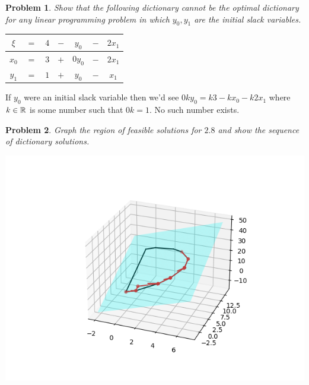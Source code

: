 \documentclass[12pt,oneside]{amsart}
\numberwithin{equation}{section}
\numberwithin{figure}{section}
\theoremstyle{plain}
\newtheorem{prob}{Problem}
\theoremstyle{definition}
\newcommand{\R}{\ensuremath \mathbb{R}}
\begin{document}
\pagebreak
\begin{prob}
Show that the following dictionary cannot be the optimal dictionary for any 
linear programming problem in which $y_0,y_1$ are the initial slack variables. \\
\begin{center}
\begin{tabular}{|ccccccc|}
  \hline
  $\xi$ & $=$ & $4$ & $-$ & $y_0$  & $-$ & $2x_1$ \\
  \hline
  $x_0$ & $=$ & $3$ & $+$ & $0y_0$ & $-$ & $2x_1$ \\
  $y_1$ & $=$ & $1$ & $+$ & $y_0$  & $-$ & $x_1$  \\
  \hline
\end{tabular}
\end{center}
\end{prob}
If $y_0$ were an initial slack variable then we'd see $0ky_0 = k3 - kx_0 - k2x_1$ 
where $k \in \R$ is some number such that $0k = 1$. No such number exists.

\begin{prob}
Graph the region of feasible solutions for $2.8$ and show the sequence of 
dictionary solutions.
\end{prob}
\includegraphics{Figure_1.png}
\pagebreak
\end{document}
